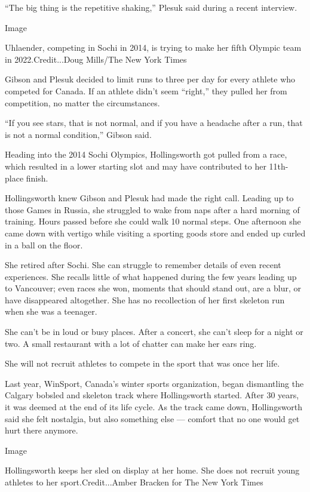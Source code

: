 ``The big thing is the repetitive shaking,'' Plesuk said during a recent
interview.

Image

Uhlaender, competing in Sochi in 2014, is trying to make her fifth
Olympic team in 2022.Credit...Doug Mills/The New York Times

Gibson and Plesuk decided to limit runs to three per day for every
athlete who competed for Canada. If an athlete didn't seem ``right,''
they pulled her from competition, no matter the circumstances.

``If you see stars, that is not normal, and if you have a headache after
a run, that is not a normal condition,'' Gibson said.

Heading into the 2014 Sochi Olympics, Hollingsworth got pulled from a
race, which resulted in a lower starting slot and may have contributed
to her 11th-place finish.

Hollingsworth knew Gibson and Plesuk had made the right call. Leading up
to those Games in Russia, she struggled to wake from naps after a hard
morning of training. Hours passed before she could walk 10 normal steps.
One afternoon she came down with vertigo while visiting a sporting goods
store and ended up curled in a ball on the floor.

She retired after Sochi. She can struggle to remember details of even
recent experiences. She recalls little of what happened during the few
years leading up to Vancouver; even races she won, moments that should
stand out, are a blur, or have disappeared altogether. She has no
recollection of her first skeleton run when she was a teenager.

She can't be in loud or busy places. After a concert, she can't sleep
for a night or two. A small restaurant with a lot of chatter can make
her ears ring.

She will not recruit athletes to compete in the sport that was once her
life.

Last year, WinSport, Canada's winter sports organization, began
dismantling the Calgary bobsled and skeleton track where Hollingsworth
started. After 30 years, it was deemed at the end of its life cycle. As
the track came down, Hollingsworth said she felt nostalgia, but also
something else --- comfort that no one would get hurt there anymore.

Image

Hollingsworth keeps her sled on display at her home. She does not
recruit young athletes to her sport.Credit...Amber Bracken for The New
York Times


